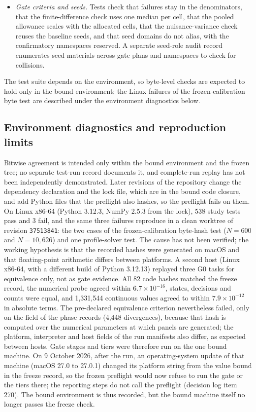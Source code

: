 \begin{itemize}
\item \emph{Gate criteria and seeds.} Tests check that failures stay in the denominators, that the finite-difference check uses one median per cell, that the pooled allowance scales with the allocated cells, that the nuisance-variance check reuses the baseline seeds, and that seed domains do not alias, with the confirmatory namespaces reserved. A separate seed-role audit record enumerates seed materials across gate plans and namespaces to check for collisions.
\end{itemize}
The test suite depends on the environment, so byte-level checks are expected to hold only in the bound environment; the Linux failures of the frozen-calibration byte test are described under the environment diagnostics below.

\subsection{Environment diagnostics and reproduction limits}\label{sec:verification-limits}

Bitwise agreement is intended only within the bound environment and the frozen tree; no separate test-run record documents it, and complete-run replay has not been independently demonstrated. Later revisions of the repository change the dependency declaration and the lock file, which are in the bound code closure, and add Python files that the preflight also hashes, so the preflight fails on them. %
On Linux x86-64 (Python 3.12.3, NumPy 2.5.3 from the lock), 538 study tests pass and 3 fail, and the same three failures reproduce in a clean worktree of revision \texttt{37513841}: the two cases of the frozen-calibration byte-hash test ($N=600$ and $N=10{,}626$) and one profile-solver test. %
The cause has not been verified; the working hypothesis is that the recorded hashes were generated on macOS and that floating-point arithmetic differs between platforms. %
A second host (Linux x86-64, with a different build of Python 3.12.13) replayed three G0 tasks for equivalence only, not as gate evidence. %
All 82 code hashes matched the freeze record, the numerical probe agreed within $6.7\times10^{-16}$, states, decisions and counts were equal, and 1,331,544 continuous values agreed to within $7.9\times10^{-12}$ in absolute terms. %
The pre-declared equivalence criterion nevertheless failed, only on the  field of the phase records (4,448 divergences), because that hash is computed over the numerical parameters at which panels are generated; the platform, interpreter and host fields of the run manifests also differ, as expected between hosts. %
Gate stages and tiers were therefore run on the one bound machine. %
On 9 October 2026, after the run, an operating-system update of that machine (macOS 27.0 to 27.0.1) changed its platform string from the value bound in the freeze record, so the frozen preflight would now refuse to run the gate or the tiers there; the reporting steps do not call the preflight (decision log item 270). The bound environment is thus recorded, but the bound machine itself no longer passes the freeze check.

